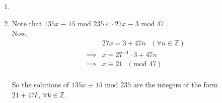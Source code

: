 \begin{enumerate}

\item

\item Note that $135x \equiv 15 \textrm{ mod } 235 \iff 27x \equiv 3
\textrm{ mod } 47$ \cite{slides_30}.\\

Now, \begin{eqnarray*}
	&& 27x = 3 + 47n \textrm{ } (\forall n \in \mathbb{Z}) \\
	&\implies& x = 27^{-1} \cdot 3 + 47n \\
	&\implies& x \equiv 21 \textrm{ } (\textrm{mod } 47) \\
\end{eqnarray*}

So the solutions of $135x \equiv 15 \textrm{ mod } 235$ are the integers of the
form $21 + 47k \textrm{, } \forall k \in \mathbb{Z}$.

\end{enumerate}
